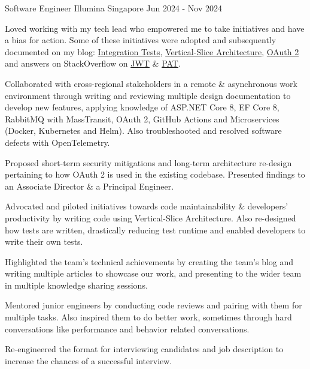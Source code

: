 \begin{cventries}
\cventry
{Software Engineer} %
{Illumina} %
{Singapore} %
{Jun 2024 - Nov 2024} %
{
  \begin{cvitems} %
    \item {Loved working with my tech lead who empowered me to take initiatives and have a bias for action. Some of these initiatives were adopted and subsequently documented on my blog: \href{https://bit.ly/zy-tests}{Integration Tests}, \href{https://bit.ly/zy-vsa}{Vertical-Slice Architecture}, \href{https://bit.ly/zy-oauth2}{OAuth 2} and answers on StackOverflow on \href{https://bit.ly/zy-jwt}{JWT} \& \href{https://bit.ly/zy-pat}{PAT}.}
    \item {Collaborated with cross-regional stakeholders in a remote \& asynchronous work environment through writing and reviewing multiple design documentation to develop new features, applying knowledge of ASP.NET Core 8, EF Core 8, RabbitMQ with MassTransit, OAuth 2, GitHub Actions and Microservices (Docker, Kubernetes and Helm). Also troubleshooted and resolved software defects with OpenTelemetry.}
    \item {Proposed short-term security mitigations and long-term architecture re-design pertaining to how OAuth 2 is used in the existing codebase. Presented findings to an Associate Director \& a Principal Engineer.}
    \item {Advocated and piloted initiatives towards code maintainability \& developers' productivity by writing code using Vertical-Slice Architecture. Also re-designed how tests are written, drastically reducing test runtime and enabled developers to write their own tests.}
    \item {Highlighted the team's technical achievements by creating the team's blog and writing multiple articles to showcase our work, and presenting to the wider team in multiple knowledge sharing sessions.}
    \item {Mentored junior engineers by conducting code reviews and pairing with them for multiple tasks. Also inspired them to do better work, sometimes through hard conversations like performance and behavior related conversations.}
    \item {Re-engineered the format for interviewing candidates and job description to increase the chances of a successful interview.}
  \end{cvitems}
}


\end{cventries}
